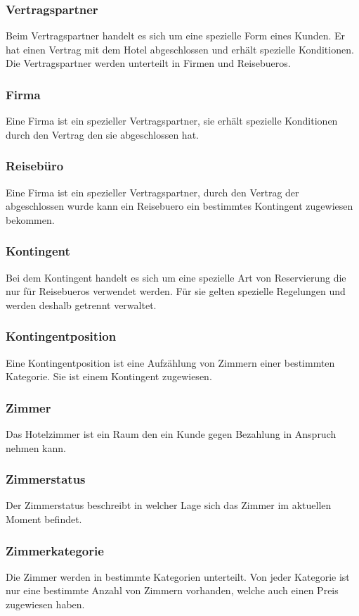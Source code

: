 \documentclass[10pt,a4paper,titlepage]{article}
\begin{document}
\subsubsection{Vertragspartner}
Beim Vertragspartner handelt es sich um eine spezielle Form eines \Gls{Kunde}n.
Er hat einen Vertrag mit dem Hotel abgeschlossen und erhält spezielle Konditionen. Die Vertragspartner werden unterteilt in Firmen und \Glspl{Reisebuero}.
\subsubsection{Firma}
Eine Firma ist ein spezieller Vertragspartner, sie erhält spezielle Konditionen
durch den Vertrag den sie abgeschlossen hat.
\subsubsection{Reisebüro}
Eine Firma ist ein spezieller Vertragspartner, durch den Vertrag der
abgeschlossen wurde kann ein \Gls{Reisebuero} ein bestimmtes Kontingent
zugewiesen bekommen.
\subsubsection{Kontingent}
Bei dem Kontingent handelt es sich um eine spezielle Art von Reservierung die nur für \Glspl{Reisebuero} verwendet werden. Für sie gelten spezielle Regelungen und werden deshalb getrennt verwaltet.
\subsubsection{Kontingentposition}
Eine Kontingentposition ist eine Aufzählung von Zimmern einer bestimmten
Kategorie. Sie ist einem Kontingent zugewiesen.
\subsubsection{Zimmer}
Das Hotelzimmer ist ein Raum den ein Kunde gegen Bezahlung in Anspruch nehmen kann.
\subsubsection{Zimmerstatus}
Der Zimmerstatus beschreibt in welcher Lage sich das Zimmer im aktuellen Moment befindet.
\subsubsection{Zimmerkategorie}
Die Zimmer werden in bestimmte Kategorien unterteilt. Von jeder Kategorie ist
nur eine bestimmte Anzahl von Zimmern vorhanden, welche auch einen Preis
zugewiesen haben.
\end{document}
